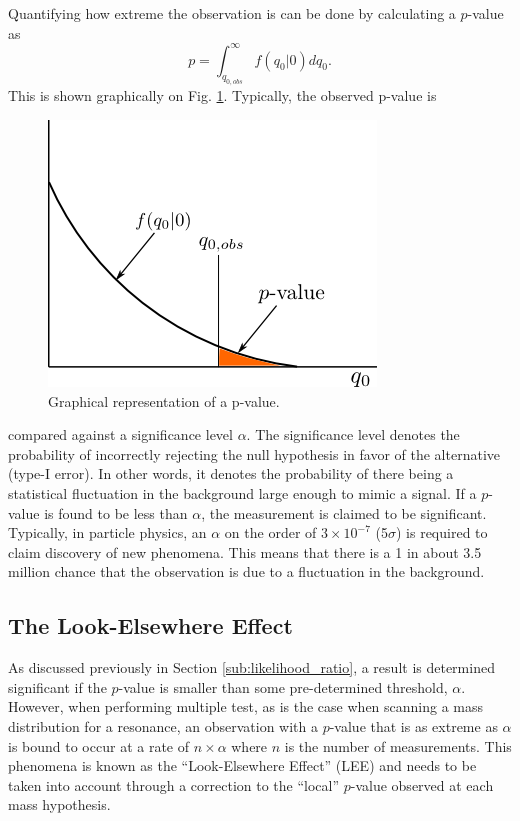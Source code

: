 Quantifying how extreme the observation is can be done by calculating a $p$-value as
\begin{equation}
    p = \int_{q_{0,obs}}^{\infty} f(q_{0} | 0) dq_{0}.
\end{equation} 
This is shown graphically on Fig. \ref{fig:p_value}.  Typically, the observed 
p-value is
\begin{figure}[t]
    \centering
    \includegraphics[width=.5\textwidth]{images/p_value.png}
    \caption{Graphical representation of a p-value.}
    \label{fig:p_value}
\end{figure}
compared against a significance level $\alpha$.  The significance level denotes
the probability of incorrectly rejecting the null hypothesis in favor of the 
alternative (type-I error).  In other words, it denotes the probability of there
being a statistical fluctuation in the background large enough to mimic a signal.  
If a $p$-value is 
found to be less than $\alpha$, the measurement is claimed to be significant. 
Typically, in particle 
physics, an $\alpha$ on the order of $3 \times 10^{-7}$ (5$\sigma$) is required
to claim discovery of new phenomena.  This means that there is a 1 in 
about 3.5 million chance that the observation is due to a fluctuation in the background.

\subsection{The Look-Elsewhere Effect}

As discussed previously in Section \ref{sub:likelihood_ratio}, a result is 
determined significant if the $p$-value is smaller than some pre-determined
threshold, $\alpha$.  However, 
when performing multiple test, as is the case when scanning a mass distribution
for a resonance, an observation with a $p$-value that is as extreme as $\alpha$
is bound to occur at a rate of $n\times\alpha$ where $n$ is the number of measurements.
This phenomena is known as the ``Look-Elsewhere Effect'' (LEE)
and needs to be taken into account through a correction to the ``local'' $p$-value
observed at each mass hypothesis.

